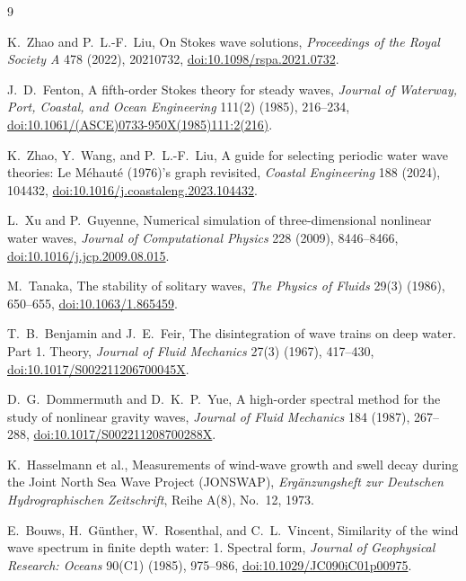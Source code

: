 \documentclass[11pt]{article}
\begin{document}
\begin{thebibliography}{9}

K.~Zhao and P.~L.-F.~Liu,
\newblock On Stokes wave solutions,
\newblock \emph{Proceedings of the Royal Society A} 478 (2022), 20210732,
\href{https://doi.org/10.1098/rspa.2021.0732}
{doi:10.1098/rspa.2021.0732}.

J.~D.~Fenton,
\newblock A fifth-order Stokes theory for steady waves,
\newblock \emph{Journal of Waterway, Port, Coastal, and Ocean Engineering}
111(2) (1985), 216--234,
\href{https://doi.org/10.1061/(ASCE)0733-950X(1985)111:2(216)}
{doi:10.1061/(ASCE)0733-950X(1985)111:2(216)}.

K.~Zhao, Y.~Wang, and P.~L.-F.~Liu,
\newblock A guide for selecting periodic water wave theories:
Le M\'ehaut\'e (1976)'s graph revisited,
\newblock \emph{Coastal Engineering} 188 (2024), 104432,
\href{https://doi.org/10.1016/j.coastaleng.2023.104432}
{doi:10.1016/j.coastaleng.2023.104432}.

L.~Xu and P.~Guyenne,
\newblock Numerical simulation of three-dimensional nonlinear water waves,
\newblock \emph{Journal of Computational Physics} 228 (2009), 8446--8466,
\href{https://doi.org/10.1016/j.jcp.2009.08.015}
{doi:10.1016/j.jcp.2009.08.015}.

M.~Tanaka,
\newblock The stability of solitary waves,
\newblock \emph{The Physics of Fluids} 29(3) (1986), 650--655,
\href{https://doi.org/10.1063/1.865459}
{doi:10.1063/1.865459}.

T.~B.~Benjamin and J.~E.~Feir,
\newblock The disintegration of wave trains on deep water. Part 1. Theory,
\newblock \emph{Journal of Fluid Mechanics} 27(3) (1967), 417--430,
\href{https://doi.org/10.1017/S002211206700045X}
{doi:10.1017/S002211206700045X}.

D.~G.~Dommermuth and D.~K.~P.~Yue,
\newblock A high-order spectral method for the study of nonlinear gravity
waves,
\newblock \emph{Journal of Fluid Mechanics} 184 (1987), 267--288,
\href{https://doi.org/10.1017/S002211208700288X}
{doi:10.1017/S002211208700288X}.

K.~Hasselmann et al.,
\newblock Measurements of wind-wave growth and swell decay during the Joint
North Sea Wave Project (JONSWAP),
\newblock \emph{Erg\"anzungsheft zur Deutschen Hydrographischen Zeitschrift},
Reihe A(8), No.~12, 1973.

E.~Bouws, H.~G\"unther, W.~Rosenthal, and C.~L.~Vincent,
\newblock Similarity of the wind wave spectrum in finite depth water:
1. Spectral form,
\newblock \emph{Journal of Geophysical Research: Oceans} 90(C1) (1985),
975--986,
\href{https://doi.org/10.1029/JC090iC01p00975}
{doi:10.1029/JC090iC01p00975}.

\end{thebibliography}
\end{document}
